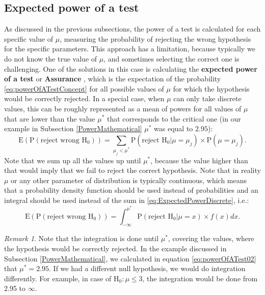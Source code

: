 \documentclass[
]{book}
\theoremstyle{definition}
\theoremstyle{definition}
\theoremstyle{definition}
\theoremstyle{definition}
\theoremstyle{remark}
\newtheorem*{remark}{Remark}
\begin{document}
\hypertarget{expected-power-of-a-test}{%
\subsection{Expected power of a test}\label{expected-power-of-a-test}}

As discussed in the previous subsections, the power of a test is calculated for each specific value of \(\mu\), measuring the probability of rejecting the wrong hypothesis for the specific parameters. This approach has a limitation, because typically we do not know the true value of \(\mu\), and sometimes selecting the correct one is challenging. One of the solutions in this case is calculating the \textbf{expected power of a test} or \textbf{Assurance} \citep{OHagan2005}, which is the expectation of the probability \eqref{eq:powerOfATestConcept} for all possible values of \(\mu\) for which the hypothesis would be correctly rejected. In a special case, when \(\mu\) can only take discrete values, this can be roughly represented as a mean of powers for all values of \(\mu\) that are lower than the value \(\mu^*\) that corresponds to the critical one (in our example in Subsection \ref{PowerMathematical} \(\mu^*\) was equal to \(2.95\)):
\begin{equation}
    \mathrm{E}(\mathrm{P}(\text{reject wrong }\mathrm{H}_0)) = \sum_{\mu_j<\mu^*} \mathrm{P}(\text{reject }\mathrm{H}_0 | \mu=\mu_j) \times \mathrm{P}(\mu=\mu_j) .
    \label{eq:ExpectedPowerDiscrete}
\end{equation}
Note that we sum up all the values up until \(\mu^*\), because the value higher than that would imply that we fail to reject the correct hypothesis. Note that in reality \(\mu\) or any other parameter of distribution is typically continuous, which means that a probability density function should be used instead of probabilities and an integral should be used instead of the sum in \eqref{eq:ExpectedPowerDiscrete}, i.e.:
\begin{equation}
    \mathrm{E}(\mathrm{P}(\text{reject wrong }\mathrm{H}_0)) = \int_{-\infty}^{\mu^*} \mathrm{P}(\text{reject }\mathrm{H}_0 | \mu=x) \times f(x)dx .
    \label{eq:ExpectedPower}
\end{equation}

\begin{remark}
Note that the integration is done until \(\mu^*\), covering the values, where the hypothesis would be correctly rejected. In the example discussed in Subsection \ref{PowerMathematical}, we calculated in equation \eqref{eq:powerOfATest02} that \(\mu^*=2.95\). If we had a different null hypothesis, we would do integration differently. For example, in case of \(\mathrm{H}_0: \mu \leq 3\), the integration would be done from 2.95 to \(\infty\).
\end{remark}
\end{document}
